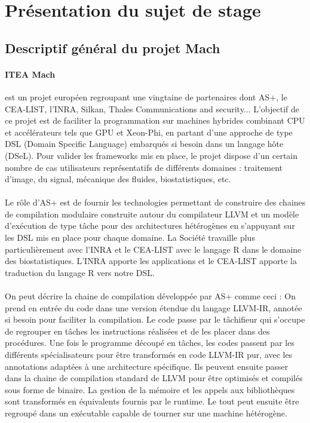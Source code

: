 \section{Présentation du sujet de stage}
\subsection{Descriptif général du projet Mach}
\paragraph{ITEA Mach}
est un projet européen regroupant une vingtaine de partenaires dont AS+, le
CEA-LIST, l'INRA, Silkan, Thales Communications and security... L'objectif de ce
projet est de faciliter la programmation sur machines hybrides combinant CPU et
accélérateurs tels que GPU et Xeon-Phi, en partant d'une approche de type DSL
(Domain Specific Language) embarqués si besoin dans un langage hôte (DSeL). Pour
valider les frameworks mis en place, le projet dispose d’un certain nombre de
cas utilisateurs représentatifs de différents domaines : traitement d’image, du
signal, mécanique des fluides, biostatistiques, etc.

\paragraph{}
Le rôle d'AS+ est de fournir les technologies permettant de construire des
chaines de compilation modulaire construite autour du compilateur LLVM et un
modèle d’exécution de type tâche pour des architectures hétérogènes en
s’appuyant sur les DSL mis en place pour chaque domaine. La Société travaille
plus particulièrement avec l’INRA et le CEA-LIST avec le langage R dans le
domaine des biostatistiques. L’INRA apporte les applications et le CEA-LIST
apporte la traduction du langage R vers notre DSL.

\paragraph{}
On peut décrire la chaine de compilation développée par AS+ comme ceci : On
prend en entrée du code dans une version étendue du langage LLVM-IR, annotée si
besoin pour faciliter la compilation. Le code passe par le tâchifieur qui
s'occupe de regrouper en tâches les instructions réalisées et de les placer dans
des procédures. Une fois le programme découpé en tâches, les codes passent par
les différents spécialisateurs pour être transformés en code LLVM-IR pur, avec
les annotations adaptées à une architecture spécifique. Ils peuvent ensuite
passer dans la chaine de compilation standard de LLVM pour être optimisés et
compilés sous forme de binaire. La gestion de la mémoire et les appels aux
bibliothèques sont transformés en équivalents fournis par le runtime. Le tout
peut ensuite être regroupé dans un exécutable capable de tourner sur une machine
hétérogène.

